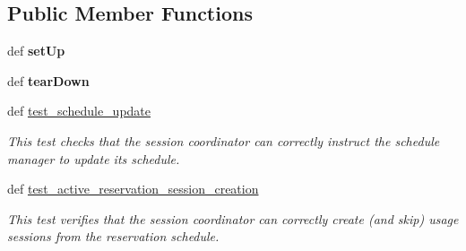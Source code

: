 \subsection*{Public Member Functions}
\begin{DoxyCompactItemize}
\item 
\hypertarget{classhwm_1_1sessions_1_1tests_1_1test__coordinator_1_1_test_coordinator_ad515ad14dc1a984de607635a81a67455}{def {\bfseries set\-Up}}\label{classhwm_1_1sessions_1_1tests_1_1test__coordinator_1_1_test_coordinator_ad515ad14dc1a984de607635a81a67455}

\item 
\hypertarget{classhwm_1_1sessions_1_1tests_1_1test__coordinator_1_1_test_coordinator_a363d58d2e8912298a07f77b7990e039a}{def {\bfseries tear\-Down}}\label{classhwm_1_1sessions_1_1tests_1_1test__coordinator_1_1_test_coordinator_a363d58d2e8912298a07f77b7990e039a}

\item 
\hypertarget{classhwm_1_1sessions_1_1tests_1_1test__coordinator_1_1_test_coordinator_a3327bf6cf9f23d00fe71d525f409b82f}{def \hyperlink{classhwm_1_1sessions_1_1tests_1_1test__coordinator_1_1_test_coordinator_a3327bf6cf9f23d00fe71d525f409b82f}{test\-\_\-schedule\-\_\-update}}\label{classhwm_1_1sessions_1_1tests_1_1test__coordinator_1_1_test_coordinator_a3327bf6cf9f23d00fe71d525f409b82f}

\begin{DoxyCompactList}\small\item\em This test checks that the session coordinator can correctly instruct the schedule manager to update its schedule. \end{DoxyCompactList}\item 
\hypertarget{classhwm_1_1sessions_1_1tests_1_1test__coordinator_1_1_test_coordinator_a1dcc013c1674fd593b0f2bb86f7ec325}{def \hyperlink{classhwm_1_1sessions_1_1tests_1_1test__coordinator_1_1_test_coordinator_a1dcc013c1674fd593b0f2bb86f7ec325}{test\-\_\-active\-\_\-reservation\-\_\-session\-\_\-creation}}\label{classhwm_1_1sessions_1_1tests_1_1test__coordinator_1_1_test_coordinator_a1dcc013c1674fd593b0f2bb86f7ec325}

\begin{DoxyCompactList}\small\item\em This test verifies that the session coordinator can correctly create (and skip) usage sessions from the reservation schedule. \end{DoxyCompactList}\end{DoxyCompactItemize}
